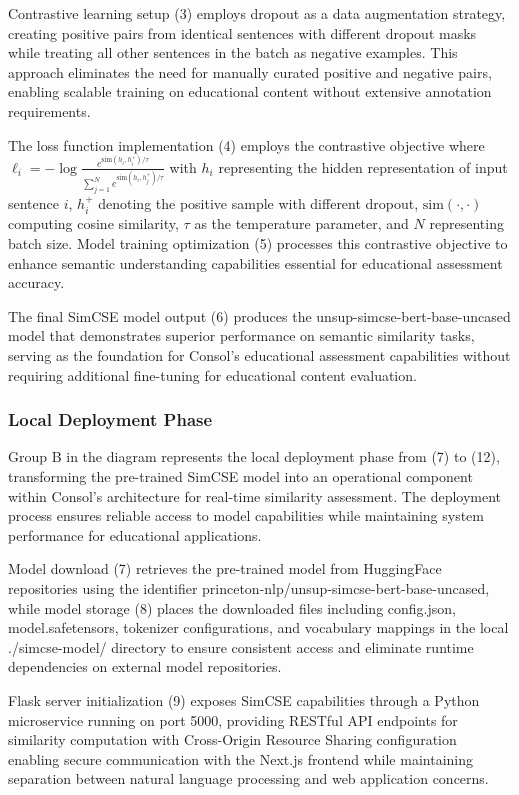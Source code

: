 {Contrastive learning setup (3) employs dropout as a data augmentation strategy, creating positive pairs from identical sentences with different dropout masks while treating all other sentences in the batch as negative examples. This approach eliminates the need for manually curated positive and negative pairs, enabling scalable training on educational content without extensive annotation requirements.

The loss function implementation (4) employs the contrastive objective where $\ell_i = -\log \frac{e^{\text{sim}(h_i, h_i^+)/\tau}}{\sum_{j=1}^{N} e^{\text{sim}(h_i, h_j^+)/\tau}}$ with $h_i$ representing the hidden representation of input sentence $i$, $h_i^+$ denoting the positive sample with different dropout, $\text{sim}(\cdot,\cdot)$ computing cosine similarity, $\tau$ as the temperature parameter, and $N$ representing batch size. Model training optimization (5) processes this contrastive objective to enhance semantic understanding capabilities essential for educational assessment accuracy.

The final SimCSE model output (6) produces the unsup-simcse-bert-base-uncased model that demonstrates superior performance on semantic similarity tasks, serving as the foundation for Consol's educational assessment capabilities without requiring additional fine-tuning for educational content evaluation.

\subsubsection{Local Deployment Phase}

Group B in the diagram represents the local deployment phase from (7) to (12), transforming the pre-trained SimCSE model into an operational component within Consol's architecture for real-time similarity assessment. The deployment process ensures reliable access to model capabilities while maintaining system performance for educational applications.

Model download (7) retrieves the pre-trained model from HuggingFace repositories using the identifier princeton-nlp/unsup-simcse-bert-base-uncased, while model storage (8) places the downloaded files including config.json, model.safetensors, tokenizer configurations, and vocabulary mappings in the local ./simcse-model/ directory to ensure consistent access and eliminate runtime dependencies on external model repositories.

Flask server initialization (9) exposes SimCSE capabilities through a Python microservice running on port 5000, providing RESTful API endpoints for similarity computation with Cross-Origin Resource Sharing configuration enabling secure communication with the Next.js frontend while maintaining separation between natural language processing and web application concerns.

}
